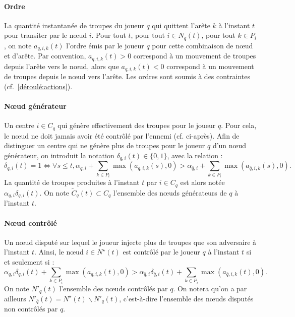 \documentclass[a4paper,11pt,headings=normal]{scrartcl}
\theoremstyle{mythm}
\begin{document}
\paragraph{Ordre} La quantité instantanée de troupes du joueur $q$ qui
quittent l'arête $k$ à l'instant $t$ pour transiter par le nœud
$i$. Pour tout $t$, pour tout $i \in N_q(t)$, pour tout $k \in P_i$,
on note $a_{q,i,k}(t)$ l'ordre émis par le joueur $q$ pour cette
combinaison de nœud et d'arête. Par convention, $a_{q,i,k}(t) > 0$
correspond à un mouvement de troupes depuis l'arête vers le nœud,
alors que $a_{q,i,k}(t) < 0$ correspond à un mouvement de troupes
depuis le nœud vers l'arête. Les ordres sont soumis à des contraintes
(cf.~\ref{déroulé:actions}).

\paragraph{Nœud générateur} Un centre $i \in C_q$ qui génère effectivement
des troupes pour le joueur $q$. Pour cela, le nœud ne doit jamais
avoir été contrôlé par l'ennemi (cf. ci-après). Afin de distinguer un
centre qui ne génère plus de troupes pour le joueur $q$ d'un nœud
générateur, on introduit la notation $\delta_{q,i}(t) \in \{0, 1\}$,
avec la relation :
\begin{equation}
  \label{eq:noeud-generateur}
  \delta_{q,i}(t) = 1 \Leftrightarrow \forall s \leq t, \alpha_{q,i} + \sum_{k \in P_i} \max \left( a_{q,i,k}(s), 0 \right) > \alpha_{{\bar q},i} + \sum_{k \in P_i} \max \left( a_{{\bar q},i,k}(s), 0 \right).
\end{equation}
La quantité de troupes produites à l'instant $t$ par $i \in C_q$ est
alors notée $\alpha_{q,i} \delta_{q,i}(t)$. On note ${\tilde C}_q(t)
\subset C_q$ l'ensemble des nœuds générateurs de $q$ à l'instant $t$.

\paragraph{Nœud contrôlé} Un nœud disputé sur lequel le joueur injecte
plus de troupes que son adversaire à l'instant $t$. Ainsi, le nœud $i
\in N^\star(t)$ est contrôlé par le joueur $q$ à l'instant $t$ si et
seulement si :
\begin{equation}
  \label{eq:noeud-controle}
  \alpha_{q,i} \delta_{q,i}(t) + \sum_{k \in P_i} \max \left( a_{q,i,k}(t), 0 \right) > \alpha_{{\bar q},i} \delta_{{\bar q},i}(t) + \sum_{k \in P_i} \max \left( a_{{\bar q},i,k}(t), 0 \right).
\end{equation}
On note $N'_q(t)$ l'ensemble des nœuds contrôlés par $q$. On notera
qu'on a par ailleurs $N'_{\bar q}(t) = N^\star(t) \backslash N'_q(t)$,
c'est-à-dire l'ensemble des nœuds disputés non contrôlés par $q$.
\end{document}
